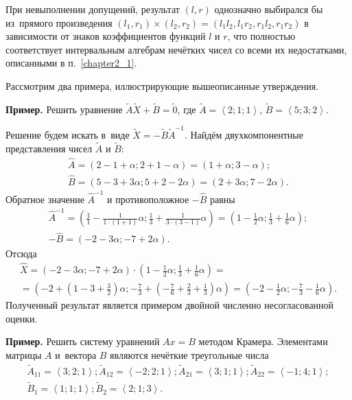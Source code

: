 При невыполнении допущений, результат $\left(l, r \right)$ однозначно выбирался бы из~прямого произведения $\left(l_1, r_1 \right) \times \left(l_2, r_2 \right) = \left(l_1l_2, l_1r_2, r_1l_2, r_1r_2 \right)$ в зависимости от знаков коэффициентов функций $l$ и $r$, что полностью соответствует интервальным алгебрам нечётких чисел со всеми их недостатками, описанными в п.~\ref{chapter2_1}.

Рассмотрим два примера, иллюстрирующие вышеописанные утверждения.

\textbf{Пример.} Решить уравнение $\tilde A \tilde X + \tilde B = \tilde 0$, где $\tilde A = \left \langle 2; 1; 1 \right \rangle$, $\tilde B = \left \langle 5; 3; 2 \right \rangle$.

Решение будем искать в~виде $\tilde X = -\tilde B \tilde A^{-1}$. Найдём двухкомпонентные представления чисел $\tilde A$ и $\tilde B$:
\begin{gather*}
  \hat A = \left(2-1+\alpha; 2+1-\alpha \right) = \left(1+\alpha; 3-\alpha \right); \\
  \hat B = \left(5-3+3\alpha; 5+2-2\alpha \right) = \left(2+3\alpha; 7-2\alpha \right).
\end{gather*}
Обратное значение $\hat A^{-1}$ и противоположное $-\hat B$ равны
\begin{gather*}
  \hat A^{-1} = \left( \frac{1}{1} - \frac{1}{1\cdot \left( 1+1\right)}\alpha; \frac{1}{3}+\frac{1}{3\cdot\left(3-1\right)}\alpha \right) = \left(1-\frac{1}{2}\alpha; \frac{1}{3}+\frac{1}{6}\alpha \right); \\
  -\hat B = \left(-2-3\alpha; -7+2\alpha \right).
\end{gather*}
Отсюда
\begin{gather*}
\hat X = \left(-2-3\alpha; -7+2\alpha \right) \cdot \left(1-\frac{1}{2}\alpha; \frac{1}{3}+\frac{1}{6}\alpha \right) = {} \\{} = \left(-2+\left(1 - 3 + \frac{3}{2} \right)\alpha; -\frac{7}{3}+\left(-\frac{7}{6} + \frac{2}{3} + \frac{1}{3} \right)\alpha \right) = \left( -2 -\frac{1}{2}\alpha; -\frac{7}{3} -\frac{1}{6}\alpha \right).
\end{gather*}
Полученный результат является примером двойной численно несогласованной оценки.

\textbf{Пример.} Решить систему уравнений $Ax=B$ методом Крамера. Элементами матрицы $A$ и~вектора $B$ являются нечёткие треугольные числа
\begin{gather*}
  \tilde A_{11} = \left \langle 3; 2; 1 \right \rangle; \tilde A_{12} = \left \langle -2; 2; 1\right \rangle; \tilde A_{21} = \left \langle 3; 1; 1\right \rangle; \tilde A_{22} = \left \langle -1; 4; 1\right \rangle; \\
  \tilde B_1 = \left \langle 1; 1; 1 \right \rangle; \tilde B_2 = \left \langle 2; 1; 3\right \rangle.
\end{gather*}

